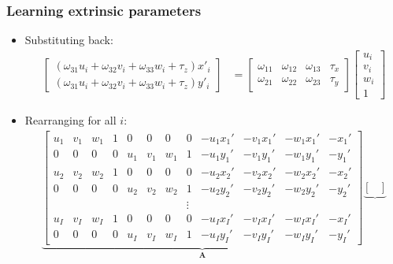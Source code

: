 \documentclass{beamer}
\begin{document}
\begin{frame}
  \frametitle{Learning extrinsic parameters}
  \begin{itemize}[<+->]
        \item Substituting back:
          \begin{align*}
          \begin{bmatrix}
            (\omega_{31}u_i+\omega_{32}v_i+\omega_{33}w_i+\tau_z)x'_i \\
            (\omega_{31}u_i+\omega_{32}v_i+\omega_{33}w_i+\tau_z)y'_i
          \end{bmatrix} &=
            \begin{bmatrix}
              \omega_{11} & \omega_{12} & \omega_{13} & \tau_x \\
              \omega_{21} & \omega_{22} & \omega_{23} & \tau_y
            \end{bmatrix}
            \begin{bmatrix}
              u_i \\ v_i \\ w_i \\ 1
            \end{bmatrix}
        \end{align*}
      \item Rearranging for all $i$:
        \tiny{
        \begin{align*}
          \underbrace{
          \begin{bmatrix}
            u_1 & v_1 & w_1 & 1 & 0 & 0 & 0 & 0 &
            -u_1 x_1' & -v_1 x_1' & -w_1 x_1' & -x_1' \\
            0 & 0 & 0 & 0 & u_1 & v_1 & w_1 & 1 &
            -u_1 y_1' & -v_1 y_1' & -w_1 y_1' & -y_1' \\
            u_2 & v_2 & w_2 & 1 & 0 & 0 & 0 & 0 &
            -u_2 x_2' & -v_2 x_2' & -w_2 x_2' & -x_2' \\
            0 & 0 & 0 & 0 & u_2 & v_2 & w_2 & 1 &
            -u_2 y_2' & -v_2 y_2' & -w_2 y_2' & -y_2' \\
                      & & & & & & & \vdots & & & \\
            u_I & v_I & w_I & 1 & 0 & 0 & 0 & 0 &
            -u_I x_I' & -v_I x_I' & -w_I x_I' & -x_I' \\
            0 & 0 & 0 & 0 & u_I & v_I & w_I & 1 &
            -u_I y_I' & -v_I y_I' & -w_I y_I' & -y_I'
          \end{bmatrix}
        }_{
          \mathbf{A}
        }
        \underbrace{
          \begin{bmatrix}

\end{bmatrix}}
\end{align*}}
\end{itemize}
\end{frame}
\end{document}
